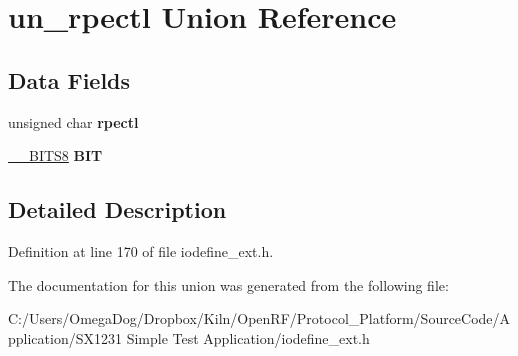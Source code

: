 \hypertarget{unionun__rpectl}{\section{un\-\_\-rpectl Union Reference}
\label{unionun__rpectl}
}
\subsection*{Data Fields}
\begin{DoxyCompactItemize}
\item 
\hypertarget{unionun__rpectl_a71448dd39b4893e6ebb4d2e36aea626d}{unsigned char {\bfseries rpectl}}\label{unionun__rpectl_a71448dd39b4893e6ebb4d2e36aea626d}

\item 
\hypertarget{unionun__rpectl_aa767d87222ccaa37319c2afe7a07322e}{\hyperlink{struct_____b_i_t_s8}{\-\_\-\-\_\-\-B\-I\-T\-S8} {\bfseries B\-I\-T}}\label{unionun__rpectl_aa767d87222ccaa37319c2afe7a07322e}

\end{DoxyCompactItemize}


\subsection{Detailed Description}


Definition at line 170 of file iodefine\-\_\-ext.\-h.



The documentation for this union was generated from the following file\-:\begin{DoxyCompactItemize}
\item 
C\-:/\-Users/\-Omega\-Dog/\-Dropbox/\-Kiln/\-Open\-R\-F/\-Protocol\-\_\-\-Platform/\-Source\-Code/\-Application/\-S\-X1231 Simple Test Application/iodefine\-\_\-ext.\-h\end{DoxyCompactItemize}
